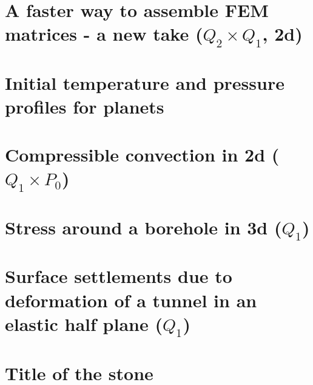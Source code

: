 \documentclass[a4paper,11pt]{report}
\begin{document}
\chapter{A faster way to assemble FEM matrices - a new take ($Q_2\times Q_1$, 2d) \label{f182}} %

\chapter{Initial temperature and pressure profiles for planets \label{f183}} %

\chapter{Compressible convection in 2d ($Q_1\times P_0$) \label{f184}} %

\chapter{Stress around a borehole in 3d ($Q_1$) \label{f185}} %

\chapter{Surface settlements due to deformation of a tunnel in an elastic half plane ($Q_1$) \label{f186}} %


\chapter{Title of the stone}

\appendix
\end{document}
